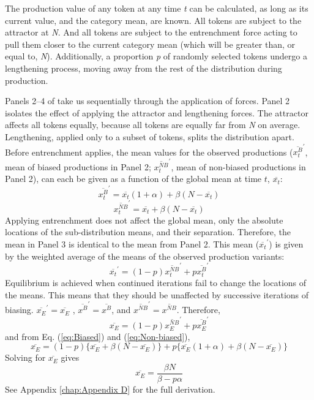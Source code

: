 The production value of any token at any time \emph{t} can be calculated,
as long as its current value, and the category mean, are known. All
tokens are subject to the attractor at \emph{N}. And all tokens are
subject to the entrenchment force acting to pull them closer to the
current category mean (which will be greater than, or equal to, \emph{N}).
Additionally, a proportion \emph{p} of randomly selected tokens undergo
a lengthening process, moving away from the rest of the distribution
during production.

Panels 2--4 of  take us sequentially through
the application of forces. Panel 2 isolates the effect of applying
the attractor and lengthening forces. The attractor affects all tokens
equally, because all tokens are equally far from \emph{N} on average.
Lengthening, applied only to a subset of tokens, splits the distribution
apart. Before entrenchment applies, the mean values for the observed
productions ($\overline{x_{t}^{B}}^{\prime}$, mean of biased productions
in Panel 2; $\overline{x_{t}^{NB}}^{\prime}$, mean of non-biased productions
in Panel 2), can each be given as a function of the global mean at
time $t$, $\overline{x_{t}}$:
\begin{equation}
\overline{x_{t}^{B}}^{\prime}=\overline{x_{t}}(1+\alpha)+\beta(N-\overline{x_{t}})\label{eq:Biased}
\end{equation}
\begin{equation}
\overline{x_{t}^{NB}}^{\prime}=\overline{x_{t}}+\beta(N-\overline{x_{t}})\label{eq:Non-biased}
\end{equation}
Applying entrenchment does not affect the global mean, only the absolute
locations of the sub-distribution means, and their separation. Therefore,
the mean in Panel 3 is identical to the mean from Panel 2. This mean
($\overline{x_{t}}^{\prime}$) is given by the weighted average of the
means of the observed production variants: 
\begin{equation}
\overline{x_{t}}^{\prime}=(1-p)\overline{x_{t}^{NB}}^{\prime}+p\overline{x_{t}^{B}}^{\prime}\label{eq: G weighted mean}
\end{equation}
Equilibrium is achieved when continued iterations fail to change the
locations of the means. This means that they should be unaffected
by successive iterations of biasing. $\overline{x_{E}}^{\prime}=\overline{x_{E}}$
, $\overline{x^{B}}^{\prime}=\overline{x^{B}}$, and $\overline{x^{NB}}^{\prime}=\overline{x^{NB}}$.
Therefore, 
\begin{equation}
\overline{x_{E}}=(1-p)\overline{x_{E}^{NB}}^{\prime}+p\overline{x_{E}^{B}}^{\prime}\label{eq:equilbrium 1}
\end{equation}
and from Eq. (\ref{eq:Biased}) and (\ref{eq:Non-biased}), 
\begin{equation}
\overline{x_{E}}=(1-p)\{\overline{x_{E}}+\beta(N-\overline{x_{E}})\}+p\{\overline{x_{E}}(1+\alpha)+\beta(N-\overline{x_{E}})\}\label{eq:equilbrium 2}
\end{equation}
Solving for $\overline{x_{E}}$ gives
\begin{equation}
\overline{x_{E}}=\frac{\beta N}{\beta-p\alpha}\label{eq: lengthening process}
\end{equation}
See Appendix \ref{chap:Appendix D} for the full derivation. 

